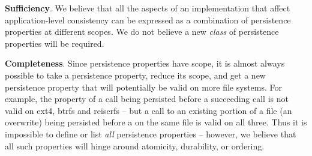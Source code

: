 \textbf{Sufficiency}. We believe that all the aspects of an implementation that
affect application-level consistency can be expressed as a combination of
persistence properties at different scopes. We do not believe a new
\textit{class} of persistence properties will be required.  

\textbf{Completeness}. Since persistence properties have scope, it is almost
always possible to take a persistence property, reduce its scope, and get a new
persistence property that will potentially be valid on more file systems. For
example, the property of a  call being persisted before a
succeeding  call is not valid on ext4, btrfs and reiserfs  --
but a  call to an existing portion of a file (an overwrite)
being persisted before a  on the same file is valid on all
three. Thus it is impossible to define or list \textit{all} persistence
properties -- however, we believe that all such properties will hinge around
atomicity, durability, or ordering. 
\fi

